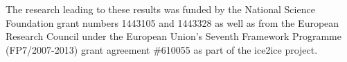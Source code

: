 \documentclass[draft, jgrga]{AGUTeX}
\begin{document}
\begin{article}







%
%
%


\begin{acknowledgments}
The research leading to these results was funded by the National Science Foundation grant numbers 1443105 and 1443328 as well as from the European Research Council under the European Union's Seventh Framework Programme (FP7/2007-2013) grant agreement \#610055 as part of the ice2ice project.
\end{acknowledgments}


\end{article}
\end{document}
